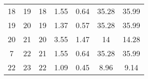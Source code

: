 \begin{table}[]
\begin{tabular}{@{}ccccccc@{}}
18                                                           & 19                                                             & 18                                                    & 1.55                                                                           & 0.64                                                                           & 35.28                                                                               & 35.99                                                                                 \\
19                                                           & 20                                                             & 19                                                    & 1.37                                                                           & 0.57                                                                           & 35.28                                                                               & 35.99                                                                                 \\
20                                                           & 21                                                             & 20                                                    & 3.55                                                                           & 1.47                                                                           & 14                                                                                  & 14.28                                                                                 \\
7                                                            & 22                                                             & 21                                                    & 1.55                                                                           & 0.64                                                                           & 35.28                                                                               & 35.99                                                                                 \\
22                                                           & 23                                                             & 22                                                    & 1.09                                                                           & 0.45                                                                           & 8.96                                                                                & 9.14                                                                                  \\

\end{tabular}
\end{table}
